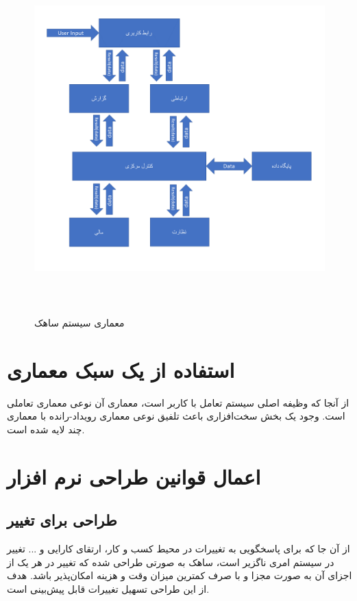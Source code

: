 \documentclass[oneside,a4paper,12pt]{book}
\begin{document}
	\begin{figure}
		\begin{center}
			\includegraphics[height=13.5cm, width=16cm]{Chapter6.png}
			\caption{معماری سیستم ساهک}
		\end{center}
	\end{figure}
	
	\section{استفاده از یک سبک معماری}
	از آنجا که وظیفه اصلی سیستم تعامل با کاربر است، معماری آن نوعی معماری تعاملی است. وجود یک بخش
	سخت‌افزاری باعث تلفیق نوعی معماری رویداد-رانده با معماری چند لایه شده است.
	
	\section{اعمال قوانین طراحی نرم افزار}
	\subsection{طراحی برای تغییر}
	از آن جا که برای پاسخگویی به تغییرات در محیط کسب و کار، ارتقای کارایی و ... تغییر در سیستم امری ناگزیر است،
	ساهک به صورتی طراحی شده که تغییر در هر یک از اجزای آن به صورت مجزا و با صرف کمترین میزان وقت و هزینه
	امکان‌پذیر باشد. هدف از این طراحی تسهیل تغییرات قابل پیش‌بینی است.
	
\end{document}
